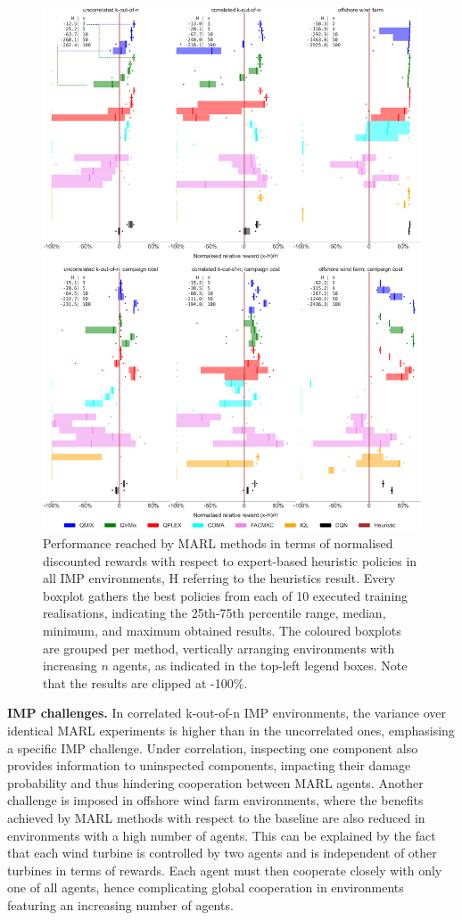 \begin{figure}
    \centering
    \includegraphics[width=.87\textwidth]{tex_thesis/figures/ch5/boxplot_perc_limit.pdf}
\caption{Performance reached by MARL methods in terms of normalised discounted rewards with respect to expert-based heuristic policies in all IMP environments, H referring to the heuristics result.
Every boxplot gathers the best policies from each of 10 executed training realisations, indicating the 25th-75th percentile range, median, minimum, and maximum obtained results.
The coloured boxplots are grouped per method, vertically arranging environments with increasing $n$ agents, as indicated in the top-left legend boxes.
Note that the results are clipped at -100\%.
}
\label{fig:results}
\end{figure}


\textbf{IMP challenges.}
In correlated k-out-of-n IMP environments, the variance over identical MARL experiments is higher than in the uncorrelated ones, emphasising a specific IMP challenge.
Under correlation, inspecting one component also provides information to uninspected components, impacting their damage probability and thus hindering cooperation between MARL agents.
Another challenge is imposed in offshore wind farm environments, where the benefits achieved by MARL methods with respect to the baseline are also reduced in environments with a high number of agents.
This can be explained by the fact that each wind turbine is controlled by two agents and is independent of other turbines in terms of rewards.
Each agent must then cooperate closely with only one of all agents, hence complicating global cooperation in environments featuring an increasing number of agents.

